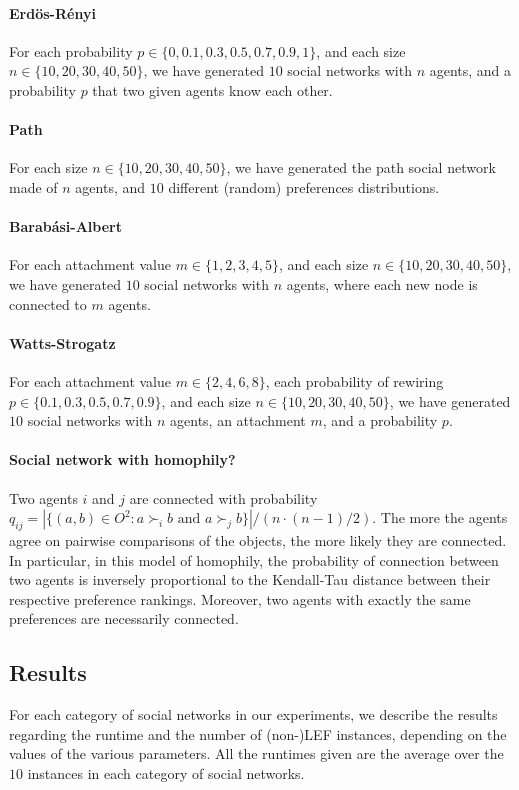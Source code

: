 \documentclass{article}
\begin{document}
\paragraph{Erd\"os-R\'enyi} For each probability $p \in \{0, 0.1, 0.3, 0.5, 0.7, 0.9, 1\}$, and each size $n \in \{10,20,30,40,50\}$, we have generated $10$ social networks with $n$ agents, and a probability $p$ that two given agents know each other.

\paragraph{Path} For each size $n \in \{10,20,30,40,50\}$, we have generated the path social network made of $n$ agents, and $10$ different (random) preferences distributions.

\paragraph{Barab\'asi-Albert} For each attachment value $m \in \{1,2,3,4,5\}$, and each size $n \in \{10,20,30,40,50\}$, we have generated $10$ social networks with $n$ agents, where each new node is connected to $m$ agents.

\paragraph{Watts-Strogatz} For each attachment value $m \in \{2,4,6,8\}$, each probability of rewiring $p \in \{0.1, 0.3, 0.5, 0.7, 0.9\}$, and each size $n \in \{10,20,30,40,50\}$, we have generated $10$ social networks with $n$ agents, an attachment $m$, and a probability $p$.

\paragraph{Social network with homophily?} Two agents $i$ and $j$ are connected with probability $q_{ij}=|\{(a,b)\in O^2:a\succ_i b\text{ and }a\succ_j b\}|/(n\cdot (n-1)/2)$.
The more the agents agree on pairwise comparisons of the objects, the more likely they are connected. 
In particular, in this model of homophily, the probability of connection between two agents is inversely proportional to the Kendall-Tau distance between their respective preference rankings. 
Moreover, two agents with exactly the same preferences are necessarily connected.




\subsection{Results}
For each category of social networks in our experiments, we describe the results regarding the runtime and the number of (non-)LEF instances, depending on the values of the various parameters. All the runtimes given are the average over the $10$ instances in each category of social networks.
\end{document}
